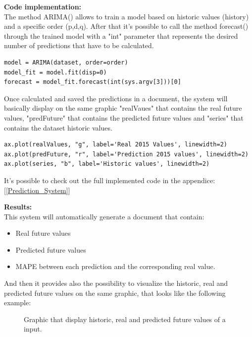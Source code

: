\textbf{Code implementation:}\\
The method ARIMA() allows to train a model based on historic values (history) and a specific order (p,d,q). After that it's possible to call the method forecast() through the trained model with a "int" parameter that represents the desired number of predictions that have to be calculated.

\begin{lstlisting}
model = ARIMA(dataset, order=order)
model_fit = model.fit(disp=0)
forecast = model_fit.forecast(int(sys.argv[3]))[0]
\end{lstlisting}

Once calculated and saved the predictions in a document, the system will basically display on the same graphic "realVaues" that contains the real future values, "predFuture" that contains the predicted future values and "series" that contains the dataset historic values.
\begin{lstlisting}
ax.plot(realValues, "g", label='Real 2015 Values', linewidth=2)
ax.plot(predFuture, "r", label='Prediction 2015 values', linewidth=2)
ax.plot(series, "b", label='Historic values', linewidth=2)
\end{lstlisting}

It's possible to check out the full implemented code in the appendice: [\ref{Prediction_System}]

\newpage

\textbf{Results:}\\
This system will automatically generate a document that contain:
\vspace{-5mm}
\begin{itemize}
 \setlength{\itemsep}{-5pt} 
\item Real future values
\item Predicted future values
\item MAPE between each prediction and the corresponding real value.
\end{itemize}

And then it provides also the possibility to visualize the historic, real and predicted future values on the same graphic, that looks like the following example:

\begin{figure}[H]
    \caption{Graphic that display historic, real and predicted future values of a input.}
\end{figure}


\newpage



